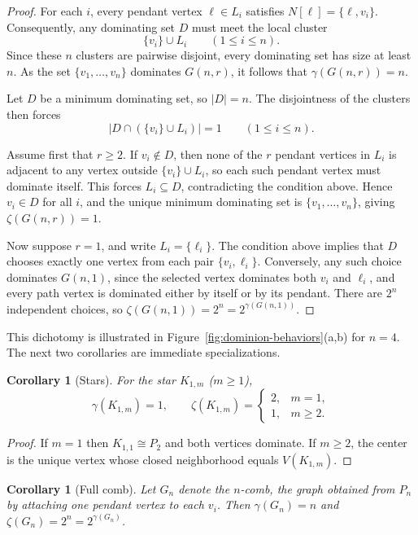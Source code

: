 \documentclass[11pt]{article}
\newtheorem{corollary}[theorem]{Corollary}
\theoremstyle{definition}
\theoremstyle{remark}
\newcommand{\gam}{\gamma}
\newcommand{\zet}{\zeta}
\begin{document}
\begin{proof}
For each $i$, every pendant vertex $\ell\in L_i$ satisfies $N[\ell]=\{\ell,v_i\}$.
Consequently, any dominating set $D$ must meet the local cluster
\[
\{v_i\}\cup L_i \qquad (1\le i\le n).
\]
Since these $n$ clusters are pairwise disjoint, every dominating set has size at least $n$.
As the set $\{v_1,\dots,v_n\}$ dominates $G(n,r)$, it follows that $\gamma(G(n,r))=n$.

Let $D$ be a minimum dominating set, so $|D|=n$.
The disjointness of the clusters then forces
\[
|D\cap(\{v_i\}\cup L_i)|=1 \qquad (1\le i\le n).
\]

Assume first that $r\ge 2$.
If $v_i\notin D$, then none of the $r$ pendant vertices in $L_i$ is adjacent to any vertex outside
$\{v_i\}\cup L_i$, so each such pendant vertex must dominate itself.
This forces $L_i\subseteq D$, contradicting the condition above.
Hence $v_i\in D$ for all $i$, and the unique minimum dominating set is
$\{v_1,\dots,v_n\}$, giving $\zeta(G(n,r))=1$.

Now suppose $r=1$, and write $L_i=\{\ell_i\}$.
The condition above implies that $D$ chooses exactly one vertex from each pair
$\{v_i,\ell_i\}$.
Conversely, any such choice dominates $G(n,1)$, since the selected vertex dominates both $v_i$ and $\ell_i$,
and every path vertex is dominated either by itself or by its pendant.
There are $2^n$ independent choices, so $\zeta(G(n,1))=2^n=2^{\gamma(G(n,1))}$.
\end{proof}


This dichotomy is illustrated in Figure~\ref{fig:dominion-behaviors}(a,b) for $n=4$.
The next two corollaries are immediate specializations.

\begin{corollary}[Stars]\label{cor:stars}
For the star $K_{1,m}$ ($m\ge 1$),
\[
\gam(K_{1,m})=1,\qquad
\zet(K_{1,m})=
\begin{cases}
2,& m=1,\\
1,& m\ge 2.
\end{cases}
\]
\end{corollary}

\begin{proof}
If $m=1$ then $K_{1,1}\cong P_2$ and both vertices dominate. If $m\ge 2$, the center is the unique vertex
whose closed neighborhood equals $V(K_{1,m})$.
\end{proof}

\begin{corollary}[Full comb]\label{cor:comb}
Let $G_n$ denote the $n$-comb, the graph obtained from $P_n$ by attaching one pendant vertex to each $v_i$.
Then $\gam(G_n)=n$ and $\zet(G_n)=2^n=2^{\gam(G_n)}$.
\end{corollary}
\end{document}
